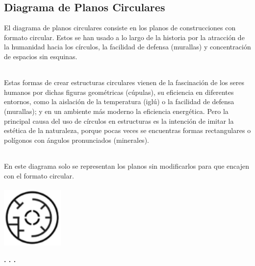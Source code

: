 \documentclass{article}\usepackage[]{graphicx}\usepackage[]{color}
\begin{document}
\subsection{Diagrama de Planos Circulares}
El diagrama de planos circulares consiste en los planos de construcciones con formato circular. Estos se han usado a lo largo de la historia por la atracci\'on de la humanidad hacia los c\'irculos, la facilidad de defensa (murallas) y concentraci\'on de espacios sin esquinas.~\\~\par
Estas formas de crear estructuras circulares vienen de la fascinaci\'on de los seres humanos por dichas figuras geom\'etricas (c\'upulas), su eficiencia en diferentes entornos, como la aislaci\'on de la temperatura (igl\'u) o la facilidad de defensa (murallas); y en un ambiente m\'as moderno la eficiencia energ\'etica. Pero la principal causa del uso de c\'irculos en estructuras es la intenci\'on de imitar la est\'etica de la naturaleza, porque pocas veces se encuentras formas rectangulares o pol\'igonos con \'angulos pronunciados (minerales)\cite{ex-plcir}.~\\~\par
En este diagrama solo se representan los planos sin modificarlos para que encajen con el formato circular.
~\\~\\
\vbox{
    \centering
    \includegraphics[width=0.23\textwidth]{imag/planos}
}
\begin{center}
\textbf{. . .}
\end{center}
\end{document}
